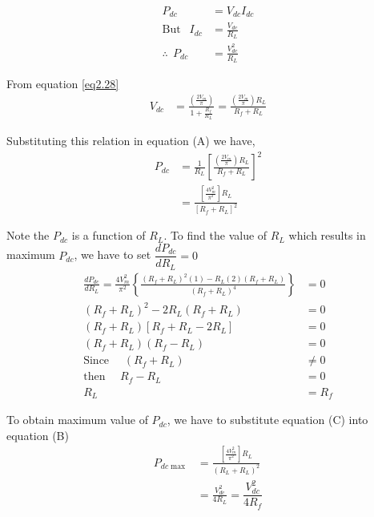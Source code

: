 \begin{solution}
\begin{align*}
P_{dc} & = V_{dc} I_{dc} \\
\text{But } ~~ I_{dc}  & = \frac{V_{dc}}{R_L} \\
\therefore ~~ P_{dc} & = \frac{V^2_{dc}}{R_L} \tag{A} 
 \end{align*}

From equation \eqref{eq2.28}
\begin{align*}
V_{dc} & = \frac{\left(\frac{2 V_m}{\pi} \right)}{1 + \frac{R_f}{R_L}} = \frac{\left(\frac{2 V_m}{\pi} \right) R_L}{R_f + R_L}
\end{align*}

Substituting this relation in equation (A) we have,
\begin{align*}
P_{dc} & = \frac{1}{R_L} \left[\frac{\left(\frac{2V_m}{\pi} \right)
    R_L}{R_f + R_L} \right]^2\\[4pt]
& = \frac{\left[\frac{4 V^2_m}{\pi^2} \right] R_L}{[R_f + R_L]^2} \tag{B}
\end{align*}

Note the $P_{dc}$ is a function of $R_L$. To find the value of $R_L$
which results in maximum $P_{dc}$, we have to set
$\dfrac{dP_{dc}}{dR_L} = 0$
\begin{align*}
\frac{dP_{dc}}{dR_L} = \frac{4 V^2_m}{\pi^2} \left\{\frac{(R_f +
  R_L)^2 (1) - R_L (2) (R_f + R_L)}{(R_f+R_L)^4} \right\} & = 0\\[5pt]
(R_f + R_L)^2 - 2 R_L (R_f + R_L) & = 0\\[2pt]
(R_f + R_L) [R_f + R_L -2 R_L] & = 0\\[2pt]
(R_f + R_L) (R_f - R_L) & = 0\\[2pt]
\text{Since } \quad (R_f + R_L) & \neq  0\\[2pt]
\text{then } \quad  R_f - R_L & = 0\\[2pt]
R_L & = R_f  \tag{C}
\end{align*}
\end{solution}

\medskip
{}

To obtain maximum value of $P_{dc}$, we have to substitute equation (C) into equation (B)
\begin{align*}
P_{dc \max} & = \frac{\left[ \frac{4 V^2_m}{\pi^2}\right]R_L}{(R_L +
  R_L)^2} \\[4pt]
& = \frac{V^{2}_{dc}}{4R_{L}}=\dfrac{V^{2}_{dc}}{4R_{f}}\tag{D}
\end{align*}

